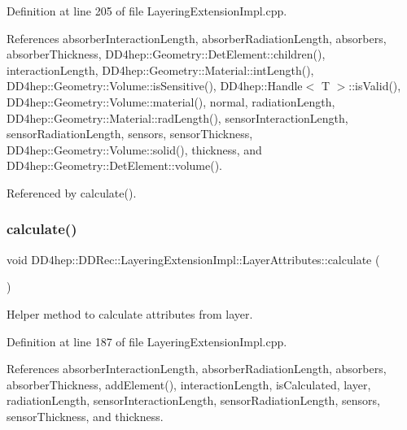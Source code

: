 Definition at line 205 of file Layering\+Extension\+Impl.\+cpp.



References absorber\+Interaction\+Length, absorber\+Radiation\+Length, absorbers, absorber\+Thickness, D\+D4hep\+::\+Geometry\+::\+Det\+Element\+::children(), interaction\+Length, D\+D4hep\+::\+Geometry\+::\+Material\+::int\+Length(), D\+D4hep\+::\+Geometry\+::\+Volume\+::is\+Sensitive(), D\+D4hep\+::\+Handle$<$ T $>$\+::is\+Valid(), D\+D4hep\+::\+Geometry\+::\+Volume\+::material(), normal, radiation\+Length, D\+D4hep\+::\+Geometry\+::\+Material\+::rad\+Length(), sensor\+Interaction\+Length, sensor\+Radiation\+Length, sensors, sensor\+Thickness, D\+D4hep\+::\+Geometry\+::\+Volume\+::solid(), thickness, and D\+D4hep\+::\+Geometry\+::\+Det\+Element\+::volume().



Referenced by calculate().

\hypertarget{struct_d_d4hep_1_1_d_d_rec_1_1_layering_extension_impl_1_1_layer_attributes_acb31b89b26048767becea08cccc4d93f}{}\label{struct_d_d4hep_1_1_d_d_rec_1_1_layering_extension_impl_1_1_layer_attributes_acb31b89b26048767becea08cccc4d93f} 
\subsubsection{\texorpdfstring{calculate()}{calculate()}}
{\footnotesize\ttfamily void D\+D4hep\+::\+D\+D\+Rec\+::\+Layering\+Extension\+Impl\+::\+Layer\+Attributes\+::calculate (\begin{DoxyParamCaption}{ }\end{DoxyParamCaption})}



Helper method to calculate attributes from layer. 



Definition at line 187 of file Layering\+Extension\+Impl.\+cpp.



References absorber\+Interaction\+Length, absorber\+Radiation\+Length, absorbers, absorber\+Thickness, add\+Element(), interaction\+Length, is\+Calculated, layer, radiation\+Length, sensor\+Interaction\+Length, sensor\+Radiation\+Length, sensors, sensor\+Thickness, and thickness.



